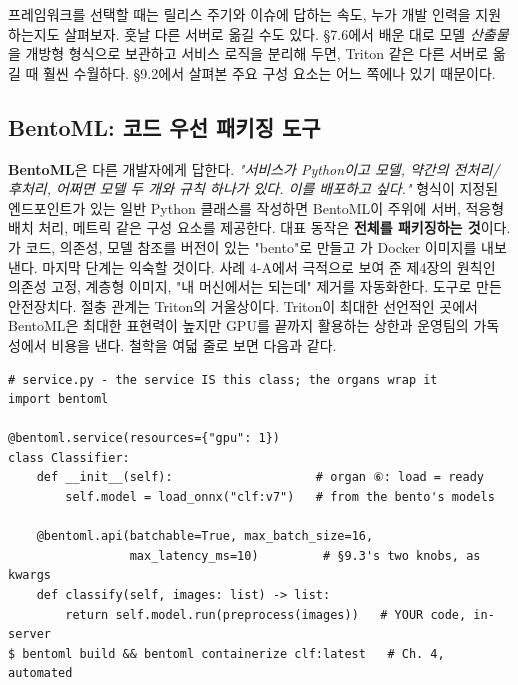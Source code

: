 프레임워크를 선택할 때는 릴리스 주기와 이슈에 답하는 속도, 누가 개발 인력을 지원하는지도 살펴보자. 훗날 다른 서버로 옮길 수도 있다. §7.6에서 배운 대로 모델 \textit{산출물}을 개방형 형식으로 보관하고 서비스 로직을 분리해 두면, Triton 같은 다른 서버로 옮길 때 훨씬 수월하다. §9.2에서 살펴본 주요 구성 요소는 어느 쪽에나 있기 때문이다.

\subsection*{BentoML: 코드 우선 패키징 도구}

\textbf{BentoML}은 다른 개발자에게 답한다. \textit{"서비스가 Python이고 모델, 약간의 전처리/후처리, 어쩌면 모델 두 개와 규칙 하나가 있다. 이를 배포하고 싶다."} 형식이 지정된 엔드포인트가 있는 일반 Python 클래스를 작성하면 BentoML이 주위에 서버, 적응형 배치 처리, 메트릭 같은 구성 요소를 제공한다. 대표 동작은 \textbf{전체를 패키징하는 것}이다. 가 코드, 의존성, 모델 참조를 버전이 있는 "bento"로 만들고 가 Docker 이미지를 내보낸다. 마지막 단계는 익숙할 것이다. 사례 4-A에서 극적으로 보여 준 제4장의 원칙인 의존성 고정, 계층형 이미지, "내 머신에서는 되는데" 제거를 자동화한다. 도구로 만든 안전장치다. 절충 관계는 Triton의 거울상이다. Triton이 최대한 선언적인 곳에서 BentoML은 최대한 표현력이 높지만 GPU를 끝까지 활용하는 상한과 운영팀의 가독성에서 비용을 낸다. 철학을 여덟 줄로 보면 다음과 같다.

\begin{terminalbox}
\begin{Verbatim}[breaklines=true,breakanywhere=true,fontsize=\small,formatcom=\color{tbbtermfg},codes=\tbbcodeactive]
# service.py - the service IS this class; the organs wrap it
import bentoml

@bentoml.service(resources={"gpu": 1})
class Classifier:
    def __init__(self):                    # organ ⑥: load = ready
        self.model = load_onnx("clf:v7")   # from the bento's models

    @bentoml.api(batchable=True, max_batch_size=16,
                 max_latency_ms=10)         # §9.3's two knobs, as kwargs
    def classify(self, images: list) -> list:
        return self.model.run(preprocess(images))   # YOUR code, in-server
$ bentoml build && bentoml containerize clf:latest   # Ch. 4, automated
\end{Verbatim}
\end{terminalbox}

